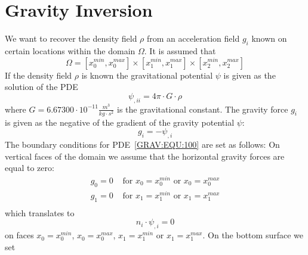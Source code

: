 
%
%
%

\chapter{Gravity Inversion}
We want to recover the density field $\rho$ from an acceleration field $g_i$ known on certain locations within the domain $\Omega$. It is
assumed that
\begin{equation}
\Omega = [x^{min}_0, x^{max}_0] \times
 [x^{min}_1, x^{max}_1] \times
 [x^{min}_2, x^{max}_2] 
\end{equation} 
If the density field $\rho$ is known the gravitational potential $\psi$ is given
as the solution of the PDE 
\begin{equation}\label{GRAV:EQU:100}
\psi_{,ii} = 4\pi \cdot G \cdot  \rho
\end{equation}
where $G=6.67300 \cdot 10^{-11}  \frac{m^3}{kg \cdot s^2}$ is the gravitational constant.  
The gravity force $g_i$ is given
as the negative of the gradient of the gravity potential $\psi$:
\begin{equation}\label{GRAV:EQU:101}
 g_i = - \psi_{,i} 
\end{equation} 
The boundary conditions for PDE~\ref{GRAV:EQU:100} are set as follows:
On vertical faces of the domain we assume that the horizontal gravity forces are equal to zero:
\begin{equation}\label{GRAV:EQU:101a}
\begin{array}{ll}
g_0=0 & \mbox{ for } x_0=x^{min}_0 \mbox{ or } x_0=x^{max}_0 \\
g_1=0 & \mbox{ for } x_1=x^{min}_1 \mbox{ or } x_1=x^{max}_1 \\
\end{array}
\end{equation}
which translates to
\begin{equation}\label{GRAV:EQU:101aa}
n_i \cdot  \psi_{,i} = 0
\end{equation} 
on faces $x_0=x^{min}_0$, 
$x_0=x^{max}_0$,
$x_1=x^{min}_1$ or 
$x_1=x^{max}_1$. On the bottom surface we set 
